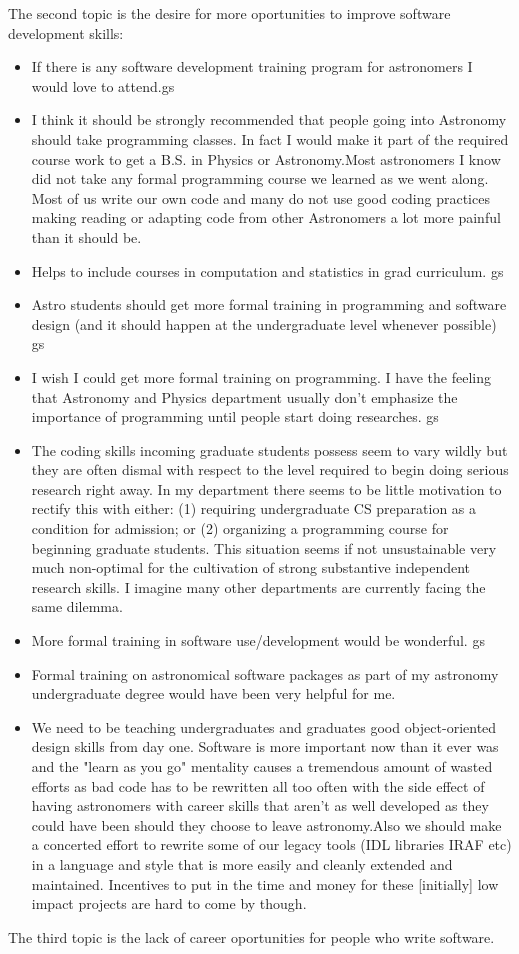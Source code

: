 The second topic is the desire for more oportunities to improve software development skills:
\begin{itemize}
\item{If there is any software development training program for astronomers I would love to attend.gs}
\item{I think it should be strongly recommended that people going into Astronomy should take programming classes. In fact I would make it part of the required course work to get a B.S. in Physics or Astronomy.Most astronomers I know did not take any formal programming course we learned as we went along. Most of us write our own code and many do not use good coding practices making reading or adapting code from other Astronomers a lot more painful than it should be.}
\item{Helps to include courses in computation and statistics in grad curriculum. gs}
\item{Astro students should get more formal training in programming and software design (and it should happen at the undergraduate level whenever possible) gs}
\item{I wish I could get more formal training on programming. I have the feeling that Astronomy and Physics department usually don't emphasize the importance of programming until people start doing researches. gs}
\item{The coding skills incoming graduate students possess seem to vary wildly but they are often dismal with respect to the level required to begin doing serious research right away. In my department there seems to be little motivation to rectify this with either: (1) requiring undergraduate CS preparation as a condition for admission; or (2) organizing a programming course for beginning graduate students. This situation seems if not unsustainable very much non-optimal for the cultivation of strong substantive independent research skills. I imagine many other departments are currently facing the same dilemma.}
\item{More formal training in software use/development would be wonderful. gs}
\item{Formal training on astronomical software packages as part of my astronomy undergraduate degree would have been very helpful for me.}
\item{We need to be teaching undergraduates and graduates good object-oriented design skills from day one. Software is more important now than it ever was and the "learn as you go" mentality causes a tremendous amount of wasted efforts as bad code has to be rewritten all too often with the side effect of having astronomers with career skills that aren't as well developed as they could have been should they choose to leave astronomy.Also we should make a concerted effort to rewrite some of our legacy tools (IDL libraries IRAF etc) in a language and style that is more easily and cleanly extended and maintained. Incentives to put in the time and money for these [initially] low impact projects are hard to come by though.}

\end{itemize}

The third topic is the lack of career oportunities for people who write software.
